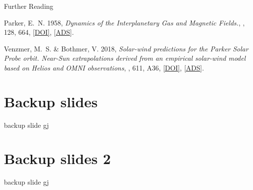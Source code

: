 \documentclass[10pt]{beamer}	%
\begin{document}
\begin{frame}[allowframebreaks]{Further Reading}
	\begin{thebibliography}{10}
	
		\beamertemplatebookbibitems
		
		\beamertemplatearticlebibitems
		
			{Parker}, E.~N. 1958, \emph{{Dynamics of the Interplanetary Gas and Magnetic Fields.}}, \apj, 128, 664, \href{http://dx.doi.org/10.1086/146579}{[DOI]}, \href{http://adsabs.harvard.edu/abs/1958ApJ...128..664P}{[ADS]}.
			
			{Venzmer}, M.~S. \& {Bothmer}, V. 2018, \emph{{Solar-wind predictions for the
			Parker Solar Probe orbit. Near-Sun extrapolations derived from an empirical
			solar-wind model based on Helios and OMNI observations}}, \aap, 611, A36,
			\href{http://dx.doi.org/10.1051/0004-6361/201731831}{[DOI]},
			\href{http://adsabs.harvard.edu/abs/2018A\%26A...611A..36V}{[ADS]}.

	\end{thebibliography}
\end{frame}

\appendix

\section{Backup slides}

\begin{frame}{backup slide}{}
	gj
\end{frame}

\section{Backup slides 2}

\begin{frame}{backup slide}{}
	gj
\end{frame}

% 
\end{document}
